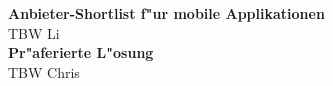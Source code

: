 \textbf{Anbieter-Shortlist f"ur mobile Applikationen}\\
TBW Li\\

\textbf{Pr"aferierte L"osung}\\
TBW Chris\\